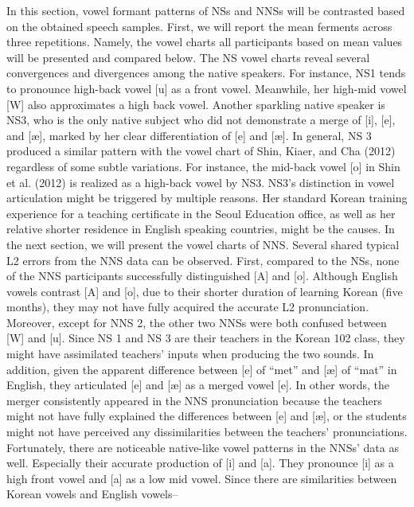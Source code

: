 \documentclass[man, fleqn, noextraspace]{apa6}
\begin{document}
In this section, vowel formant patterns of NSs and NNSs will be
contrasted based on the obtained speech samples. First, we will report
the mean ferments across three repetitions. Namely, the vowel charts all
participants based on mean values will be presented and compared below.
The NS vowel charts reveal several convergences and divergences among
the native speakers. For instance, NS1 tends to pronounce high-back
vowel {[}u{]} as a front vowel. Meanwhile, her high-mid vowel {[}W{]}
also approximates a high back vowel. Another sparkling native speaker is
NS3, who is the only native subject who did not demonstrate a merge of
{[}i{]}, {[}e{]}, and {[}æ{]}, marked by her clear differentiation of
{[}e{]} and {[}æ{]}. In general, NS 3 produced a similar pattern with
the vowel chart of Shin, Kiaer, and Cha (2012) regardless of some subtle
variations. For instance, the mid-back vowel {[}o{]} in Shin et al.
(2012) is realized as a high-back vowel by NS3. NS3's distinction in
vowel articulation might be triggered by multiple reasons. Her standard
Korean training experience for a teaching certificate in the Seoul
Education office, as well as her relative shorter residence in English
speaking countries, might be the causes. In the next section, we will
present the vowel charts of NNS. Several shared typical L2 errors from
the NNS data can be observed. First, compared to the NSs, none of the
NNS participants successfully distinguished {[}A{]} and {[}o{]}.
Although English vowels contrast {[}A{]} and {[}o{]}, due to their
shorter duration of learning Korean (five months), they may not have
fully acquired the accurate L2 pronunciation. Moreover, except for NNS
2, the other two NNSs were both confused between {[}W{]} and {[}u{]}.
Since NS 1 and NS 3 are their teachers in the Korean 102 class, they
might have assimilated teachers' inputs when producing the two sounds.
In addition, given the apparent difference between {[}e{]} of
\enquote{met} and {[}æ{]} of \enquote{mat} in English, they articulated
{[}e{]} and {[}æ{]} as a merged vowel {[}e{]}. In other words, the
merger consistently appeared in the NNS pronunciation because the
teachers might not have fully explained the differences between {[}e{]}
and {[}æ{]}, or the students might not have perceived any
dissimilarities between the teachers' pronunciations. Fortunately, there
are noticeable native-like vowel patterns in the NNSs' data as well.
Especially their accurate production of {[}i{]} and {[}a{]}. They
pronounce {[}i{]} as a high front vowel and {[}a{]} as a low mid vowel.
Since there are similarities between Korean vowels and English vowels--
\end{document}

